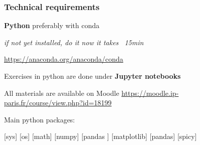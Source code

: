 \documentclass[xcolor=x11names,compress,aspectratio=169]{beamer}%
\makeatletter
\renewenvironment{itemize}{\begin{compactitemize}[<+-| alert@+>]}{\end{compactitemize}}
\makeatother
\begin{document}
\begin{frame}%
%

\frametitle{Technical requirements}%


\begin{itemize}
\item \textbf{Python} preferably with conda

\textit{if not yet installed, do it now it takes \ 15min}%
\vspace{1ex}%


\begin{itemize}
\item \url{https://anaconda.org/anaconda/conda}%
\vspace{1ex}%


\item Exercises in python are done under \textbf{Jupyter notebooks}%
\vspace{1ex}%


\item All materials are available on Moodle
\url{https://moodle.ip-paris.fr/course/view.php?id=18199}%
\vspace{1ex}%


\item Main python packages:
\end{itemize}
\end{itemize}

\begin{center}
[\textsf{sys}] [\textsf{os}] [\textsf{math}] [\textsf{numpy}] [\textsf{pandas}%
] [\textsf{matplotlib}] [\textsf{pandas}] [\textsf{spicy}]
\end{center}

%

\transboxout
\end{frame}%
%
\end{document}

